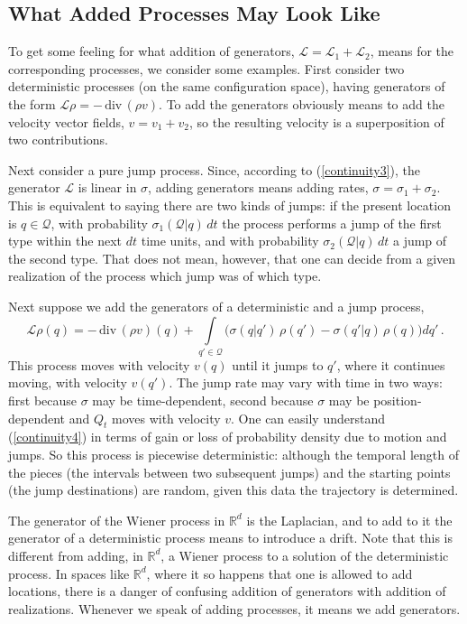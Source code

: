 \documentclass[12pt]{article}
\newcommand{\RRR}{\mathbb{R}} %
\newcommand{\1}{\mathbf{1}} %
\newcommand{\conf}{\mathcal{Q}} %
\renewcommand{\div}{\,\mathrm{div}\,} %
\newcommand{\generator}{\mathscr{L}} %
\begin{document}
\subsection{What Added Processes May Look Like}

To get some feeling for what addition of generators, $\generator =
\generator_1 + \generator_2$, means for the corresponding processes,
we consider some examples. First consider two deterministic processes
(on the same configuration space), having generators of the form
$\generator \rho = -\div(\rho v)$.  To add the generators obviously
means to add the velocity vector fields, $v=v_1 + v_2$, so the
resulting velocity is a superposition of two contributions.

Next consider a pure jump process. Since, according to
(\ref{continuity3}), the generator $\generator$ is linear in $\sigma$,
adding generators means adding rates, $\sigma = \sigma_1 +
\sigma_2$. This is equivalent to saying there are two kinds of jumps:
if the present location is $q\in\conf$, with probability
$\sigma_1(\conf|q)\,dt$ the process performs a jump of the first type
within the next $dt$ time units, and with probability
$\sigma_2(\conf|q)\,dt$ a jump of the second type. That does not mean,
however, that one can decide from a given realization of the process
which jump was of which type.

Next suppose we add the generators of a deterministic and a jump 
process,
\begin{equation}\label{continuity4}
   \generator \rho(q) = -\div(\rho v)(q) + \int\limits_{q'\in\conf}
   \Big( \sigma(q|q')\, \rho(q') - \sigma(q'|q)\, \rho(q) \Big) dq'\,.
\end{equation}
This process moves with velocity $v(q)$ until it jumps to $q'$, where
it continues moving, with velocity $v(q')$. The jump rate may vary
with time in two ways: first because $\sigma$ may be time-dependent,
second because $\sigma$ may be position-dependent and $Q_t$ moves with
velocity $v$. One can easily understand (\ref{continuity4}) in terms
of gain or loss of probability density due to motion and jumps. So
this process is piecewise deterministic: although the temporal length
of the pieces (the intervals between two subsequent jumps) and the
starting points (the jump destinations) are random, given this data
the trajectory is determined.

The generator of the Wiener process in $\RRR^d$ is the Laplacian, and
to add to it the generator of a deterministic process means to
introduce a drift. Note that this is different from adding, in
$\RRR^d$, a Wiener process to a solution of the deterministic
process. In spaces like $\RRR^d$, where it so happens that one is
allowed to add locations, there is a danger of confusing addition of
generators with addition of realizations. Whenever we speak of adding
processes, it means we add generators.
\end{document}
